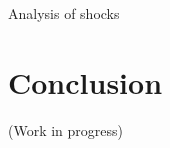 \documentclass[12pt]{article}
\begin{document}
\begin{spacing}{1.5}
Analysis of shocks 




\section{Conclusion}


(Work in progress)







\end{spacing}


\pagebreak




\nocite{*}
\end{document}

